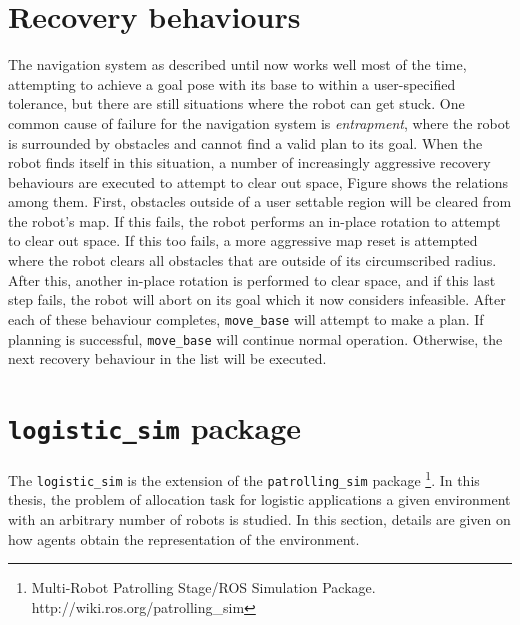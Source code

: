 \section{Recovery behaviours}
The navigation system as described until now works well most of the time,
attempting to achieve a goal pose with its base to within a user-specified
tolerance, but there are still situations where the robot can get stuck.
One common cause of failure for the navigation system is \textit{entrapment},
where the robot is surrounded by obstacles and cannot find a valid plan to its goal.
When the robot finds itself in this situation, a number of increasingly
aggressive recovery behaviours are executed to attempt to clear out space,
Figure %
shows the relations among them. First, obstacles outside of a user 
settable region will be cleared from the robot’s map.
If this fails, the robot performs an in-place rotation to attempt to clear out
space. If this too fails, a more aggressive map reset is attempted where the
robot clears all obstacles that are outside of its circumscribed radius. After
this, another in-place rotation is performed to clear space, and if this last
step fails, the robot will abort on its goal which it now considers infeasible.
After each of these behaviour completes, \texttt{move\_base} will attempt to make
a plan. If planning is successful, \texttt{move\_base} will continue normal operation.
Otherwise, the next recovery behaviour in the list will be executed.

\section{\texttt{logistic\_sim} package}
The \texttt{logistic\_sim} is the extension of the \texttt{patrolling\_sim} package
\footnote{Multi-Robot Patrolling Stage/ROS Simulation Package. http://wiki.ros.org/patrolling\_sim}.
In this thesis, the problem of allocation task for logistic applications a given 
environment with an arbitrary number of robots is studied. In this section, 
details are given on how agents obtain the representation of the environment.

